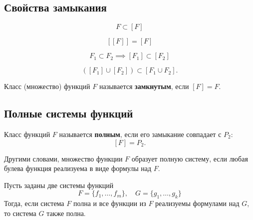 \subsection{Свойства замыкания}

\begin{property}
    \[
        F \subset [F]
    \]
\end{property}

\begin{property}[Идемпотентность]
    \[
        [[F]] = [F]
    \]
\end{property}

\begin{property}[Монотонность]
    \[
        F_1 \subset F_2 \implies [F_1] \subset [F_2]
    \]
\end{property}

\begin{property}
    \[
        ([F_1] \cup [F_2]) \subset [F_1 \cup F_2].
    \]
\end{property}

Класс (множество) функций \(F\) называется \textbf{замкнутым}, если \([F] = F\).

\subsection{Полные системы функций}

Класс функций \(F\) называется \textbf{полным}, если его замыкание совпадает с \(P_2\):
\[
    [F] = P_2.
\]

Другими словами, множество функции \(F\) образует полную систему, если любая булева функция реализуема в виде формулы над \(F\).

\begin{theorem*}
    Пусть заданы две системы функций
    \[
        F = \{f_1, \ldots, f_m\},
        \quad
        G = \{g_1, \ldots, g_k\}
    \]
    Тогда, если система \(F\) полна и все функции из \(F\) реализуемы формулами над \(G\), то система \(G\) также полна.
\end{theorem*}

